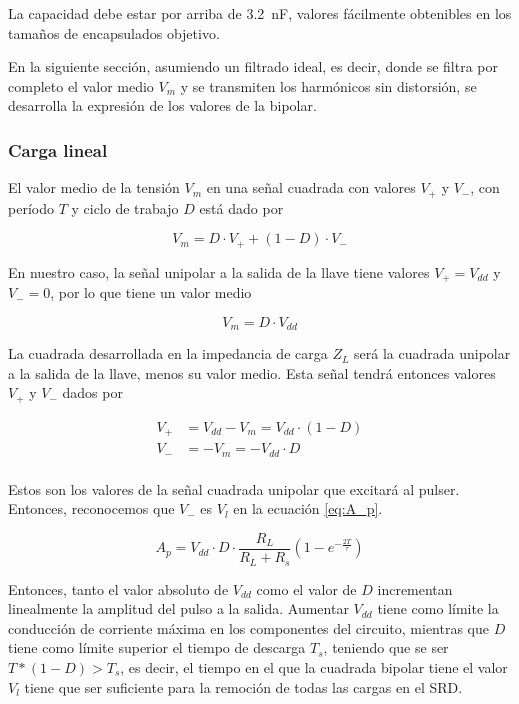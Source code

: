 La capacidad debe estar por arriba de \qty{3.2}{\nano\farad}, valores fácilmente
obtenibles en los tamaños de encapsulados objetivo.

En la siguiente sección, asumiendo un filtrado ideal, es decir, donde se filtra
por completo el valor medio $V_m$ y se transmiten los harmónicos sin distorsión,
se desarrolla la expresión de los valores de la bipolar.

\subsubsection{Carga lineal}

El valor medio de la tensión $V_m$ en una señal cuadrada con valores $V_+$ y
$V_-$, con período $T$ y ciclo de trabajo $D$ está dado por

\begin{equation}
    V_m = D \cdot V_+ + (1-D) \cdot V_-
\end{equation}

En nuestro caso, la señal unipolar a la salida de la llave tiene valores
$V_+=V_{dd}$ y $V_-=0$, por lo que tiene un valor medio

\begin{equation}
    V_m = D \cdot V_{dd}
\end{equation}

La cuadrada desarrollada en la impedancia de carga $Z_L$ será la cuadrada
unipolar a la salida de la llave, menos su valor medio. Esta señal tendrá
entonces valores $V_+$ y $V_-$ dados por

\begin{equation}
    \begin{aligned}
        V_+ &= V_{dd}-V_m = V_{dd} \cdot (1-D) \\
        V_- &= -V_m = -V_{dd} \cdot D \\
    \end{aligned}
\end{equation}

Estos son los valores de la señal cuadrada unipolar que excitará al pulser.
Entonces, reconocemos que $V_-$ es $V_l$ en la ecuación \ref{eq:A_p}.

\begin{equation}
    A_p = V_{dd} \cdot D \cdot \frac{R_L}{R_L+R_s} \left( 1-e^{-\frac{2T}{\tau}}\right)
\end{equation}

Entonces, tanto el valor absoluto de $V_{dd}$ como el valor de $D$ incrementan
linealmente la amplitud del pulso a la salida. Aumentar $V_{dd}$ tiene como
límite la conducción de corriente máxima en los componentes del circuito,
mientras que $D$ tiene como límite superior el tiempo de descarga $T_s$,
teniendo que se ser $T*(1-D) > T_s$, es decir, el tiempo en el que la cuadrada
bipolar tiene el valor $V_l$ tiene que ser suficiente para la remoción de todas
las cargas en el SRD.

